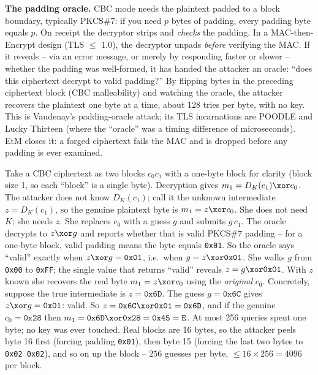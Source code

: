 \begin{attackbox}
\textbf{The padding oracle.} CBC mode needs the plaintext padded to a block boundary, typically PKCS\#7: if you need $p$ bytes of padding, every padding byte equals $p$. On receipt the decryptor strips and \emph{checks} the padding. In a MAC-then-Encrypt design (TLS $\le$ 1.0), the decryptor unpads \emph{before} verifying the MAC. If it reveals -- via an error message, or merely by responding faster or slower -- whether the padding was well-formed, it has handed the attacker an oracle: ``does this ciphertext decrypt to valid padding?'' By flipping bytes in the preceding ciphertext block (CBC malleability) and watching the oracle, the attacker recovers the plaintext one byte at a time, about 128 tries per byte, with no key. This is Vaudenay's padding-oracle attack; its TLS incarnations are POODLE and Lucky Thirteen (where the ``oracle'' was a timing difference of microseconds). EtM closes it: a forged ciphertext fails the MAC and is dropped before any padding is ever examined.
\end{attackbox}

\begin{example}
\label{ch38:ex-padding-num}
Take a CBC ciphertext as two blocks $c_0 c_1$ with a one-byte block for clarity (block size 1, so each ``block'' is a single byte). Decryption gives $m_1 = D_K(c_1) \xor c_0$. The attacker does not know $D_K(c_1)$; call it the unknown intermediate $z = D_K(c_1)$, so the genuine plaintext byte is $m_1 = z \xor c_0$. She does not need $K$; she needs $z$. She replaces $c_0$ with a guess $g$ and submits $g\,c_1$. The oracle decrypts to $z \xor g$ and reports whether that is valid PKCS\#7 padding -- for a one-byte block, valid padding means the byte equals \texttt{0x01}. So the oracle says ``valid'' exactly when $z \xor g = \texttt{0x01}$, i.e.\ when $g = z \xor \texttt{0x01}$. She walks $g$ from \texttt{0x00} to \texttt{0xFF}; the single value that returns ``valid'' reveals $z = g \xor \texttt{0x01}$. With $z$ known she recovers the real byte $m_1 = z \xor c_0$ using the \emph{original} $c_0$. Concretely, suppose the true intermediate is $z = \texttt{0x6D}$. The guess $g = \texttt{0x6C}$ gives $z\xor g = \texttt{0x01}$: valid. So $z = \texttt{0x6C}\xor\texttt{0x01} = \texttt{0x6D}$, and if the genuine $c_0 = \texttt{0x28}$ then $m_1 = \texttt{0x6D}\xor\texttt{0x28} = \texttt{0x45} = \texttt{E}$. At most 256 queries spent one byte; no key was ever touched. Real blocks are 16 bytes, so the attacker peels byte 16 first (forcing padding \texttt{0x01}), then byte 15 (forcing the last two bytes to \texttt{0x02 0x02}), and so on up the block -- $256$ guesses per byte, $\le 16\times256 = 4096$ per block.
\end{example}

